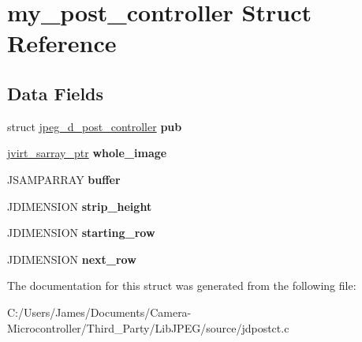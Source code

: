 \hypertarget{structmy__post__controller}{}\section{my\+\_\+post\+\_\+controller Struct Reference}
\label{structmy__post__controller}
\subsection*{Data Fields}
\begin{DoxyCompactItemize}
\item 
\mbox{\label{structmy__post__controller_a3ecc9fafee4e8493466f5eda199d0d9e}} 
struct \hyperlink{structjpeg__d__post__controller}{jpeg\+\_\+d\+\_\+post\+\_\+controller} {\bfseries pub}
\item 
\mbox{\label{structmy__post__controller_a9bebefce670970136871e926818fe3f9}} 
\hyperlink{structjvirt__sarray__control}{jvirt\+\_\+sarray\+\_\+ptr} {\bfseries whole\+\_\+image}
\item 
\mbox{\label{structmy__post__controller_a020c264c21f603ef8cb5822e2ebbba29}} 
J\+S\+A\+M\+P\+A\+R\+R\+AY {\bfseries buffer}
\item 
\mbox{\label{structmy__post__controller_a289b0323edcd85db17b3af88f02bfd92}} 
J\+D\+I\+M\+E\+N\+S\+I\+ON {\bfseries strip\+\_\+height}
\item 
\mbox{\label{structmy__post__controller_a157e2e7b2cb01fe5fa57686a9c975561}} 
J\+D\+I\+M\+E\+N\+S\+I\+ON {\bfseries starting\+\_\+row}
\item 
\mbox{\label{structmy__post__controller_aeac1f05f6af9646b33290301194e5c02}} 
J\+D\+I\+M\+E\+N\+S\+I\+ON {\bfseries next\+\_\+row}
\end{DoxyCompactItemize}


The documentation for this struct was generated from the following file\+:\begin{DoxyCompactItemize}
\item 
C\+:/\+Users/\+James/\+Documents/\+Camera-\/\+Microcontroller/\+Third\+\_\+\+Party/\+Lib\+J\+P\+E\+G/source/jdpostct.\+c\end{DoxyCompactItemize}
